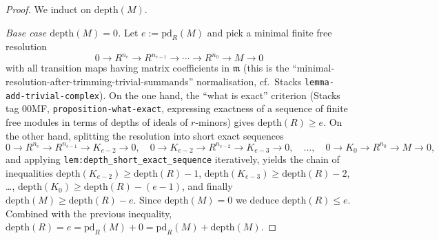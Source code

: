 \begin{proof}
  
  
\leanok
  We induct on \(\text{depth}(M)\).

  \emph{Base case \(\text{depth}(M) = 0\).} Let \(e := \text{pd}_R(M)\) and pick a minimal
  finite free resolution
  \[
    0 \longrightarrow R^{n_e} \longrightarrow R^{n_{e-1}} \longrightarrow
    \cdots \longrightarrow R^{n_0} \longrightarrow M \longrightarrow 0
  \]
  with all transition maps having matrix coefficients in \(\mathfrak{m}\) (this is the
  ``minimal-resolution-after-trimming-trivial-summands'' normalisation, cf.\ Stacks
  \texttt{lemma-add-trivial-complex}). On the one hand, the ``what is exact'' criterion
  (Stacks tag 00MF, \texttt{proposition-what-exact}, expressing exactness of a sequence of
  finite free modules in terms of depths of ideals of \(r\)-minors) gives
  \(\text{depth}(R) \geq e\). On the other hand, splitting the resolution into short exact
  sequences
  \[
    0 \to R^{n_e} \to R^{n_{e-1}} \to K_{e-2} \to 0, \quad
    0 \to K_{e-2} \to R^{n_{e-2}} \to K_{e-3} \to 0, \quad \dots, \quad
    0 \to K_0 \to R^{n_0} \to M \to 0,
  \]
  and applying \texttt{lem:depth_short_exact_sequence} iteratively,
  yields the chain of inequalities
  \(\text{depth}(K_{e-2}) \geq \text{depth}(R) - 1\),
  \(\text{depth}(K_{e-3}) \geq \text{depth}(R) - 2\), \dots,
  \(\text{depth}(K_0) \geq \text{depth}(R) - (e-1)\), and finally
  \(\text{depth}(M) \geq \text{depth}(R) - e\). Since \(\text{depth}(M) = 0\) we deduce
  \(\text{depth}(R) \leq e\). Combined with the previous inequality, $\text{depth}(R) = e =
  \text{pd}_R(M) + 0 = \text{pd}_R(M) + \text{depth}(M)$.


\end{proof}
